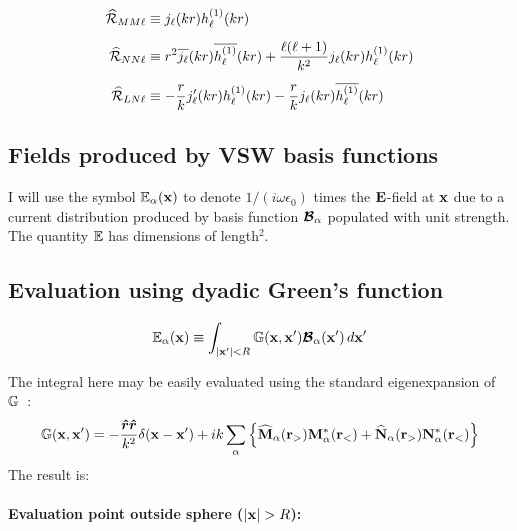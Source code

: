\documentclass[letterpaper]{article}
\begin{document}
\begin{align*}
\widehat{\mathcal{R}}_{MM\ell}&\equiv j_\ell(kr)h^{(1)}_\ell(kr)
\\[5pt]
\widehat{\mathcal{R}}_{NN\ell}&\equiv 
  r^2 \overline{j_\ell}(kr) \overline{h^{(1)}_\ell}(kr)
 +\frac{\ell(\ell+1)}{k^2}j_\ell(kr) h^{(1)}_\ell(kr)
\\[5pt]
\widehat{\mathcal{R}}_{LN\ell}&\equiv
  -\frac{r}{k}j^\prime_\ell(kr)h^{(1)}_\ell(kr)
  -\frac{r}{k}j_\ell(kr)\overline{h^{(1)}_\ell}(kr)
\end{align*}

\subsection{Fields produced by VSW basis functions}

I will use the symbol $\mathbb{E}_\alpha(\mathbf{x})$ to denote
$1/(i\omega \epsilon_0)$ times the $\mathbf{E}$-field at $\mathbf{x}$
due to a current distribution produced by basis function $\boldsymbol{\mathcal{B}}_\alpha$
populated with unit strength.
The quantity $\mathbb{E}$ has dimensions of length$^2$.

\subsection*{Evaluation using dyadic Green's function}

$$ \mathbb{E}_\alpha(\mathbf{x}) \equiv
   \int_{|\mathbf{x}^\prime|<R} \mathbb{G}(\mathbf{x}, \mathbf{x}^\prime) \boldsymbol{\mathcal{B}}_\alpha(\mathbf{x}^\prime)
  \,d\mathbf{x}^\prime
$$

The integral here may be easily evaluated using the standard eigenexpansion
of $\mathbb{G}$~\cite{Tai,Collin}:
$$ \mathbb{G}(\mathbf{x}, \mathbf{x}^\prime)
   =-\frac{\boldsymbol{\hat{r}} \boldsymbol{\hat{r}}}{k^2}\delta(\mathbf{x}-\mathbf{x}^\prime)
   +ik\sum_{\alpha} 
     \left\{ \widehat{\mathbf{M}}_\alpha(\mathbf{r}_>) \mathbf{M}_\alpha^*(\mathbf{r}_<)
            +\widehat{\mathbf{N}}_\alpha(\mathbf{r}_>) \mathbf{N}_\alpha^*(\mathbf{r}_<)
     \right\}
$$
The result is:
\paragraph{Evaluation point outside sphere ($|\vb x|>R$):}
\end{document}
